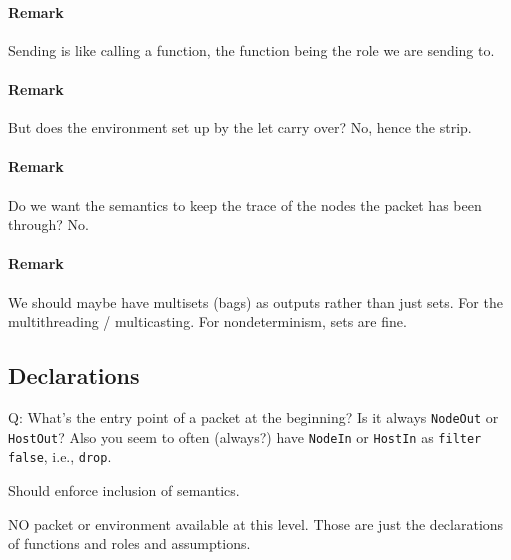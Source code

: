 \documentclass{report}
\begin{document}
\paragraph{Remark} Sending is like calling a function, the function being the role we are sending to.

\paragraph{Remark} But does the environment set up by the let carry over? No, hence the strip.

\paragraph{Remark} Do we want the semantics to keep the trace of the nodes the packet has been through?
No.

\paragraph{Remark} We should maybe have multisets (bags) as outputs rather than just sets.
For the multithreading / multicasting. For nondeterminism, sets are fine.

\subsection{Declarations}

Q: What's the entry point of a packet at the beginning? Is it always \texttt{NodeOut} or
\texttt{HostOut}? Also you seem to often (always?) have \texttt{NodeIn} or \texttt{HostIn}
as \texttt{filter false}, i.e., \texttt{drop}.

Should enforce inclusion of semantics.

NO packet or environment available at this level. Those are just the declarations of 
functions and roles and assumptions.
\end{document}
